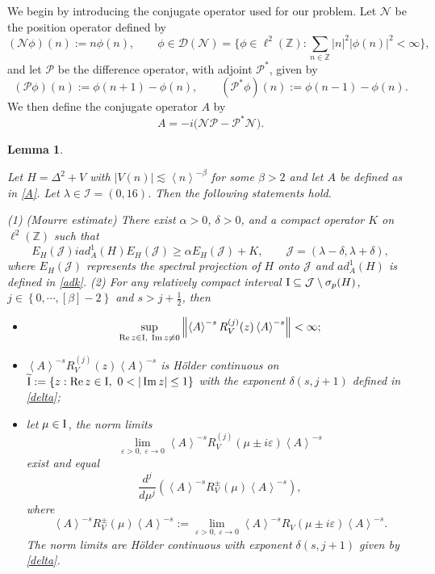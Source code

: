 \documentclass[reqno, 11pt]{amsart}
\newtheorem{lemma}[definition]{Lemma}
\newcommand\Z{\mathbb{Z}}
\newcommand\mcaI{\mathcal{I}}
\newcommand\mcaJ{\mathcal{J}}
\newcommand\mcaD{\mathcal{D}}
\newcommand\mcaN{\mathcal{N}}
\newcommand\mcaP{\mathcal{P}}
\numberwithin{equation}{section}
\begin{document}
We begin by introducing the conjugate operator used for our problem. Let $\mcaN$ be the position operator defined by
$$(\mcaN\phi)(n):=n\phi(n),\qquad \phi\in\mcaD(\mcaN)=\big\{\phi\in\ell^2(\Z):\sum\limits_{n\in\Z}|n|^2|\phi(n)|^2<\infty\big\},$$
and let $\mcaP$ be the difference operator, with adjoint $\mcaP^*$, given by
$$(\mcaP\phi)(n):=\phi(n+1)-\phi(n),\qquad (\mcaP^{*}\phi)(n):=\phi(n-1)-\phi(n).$$
We then define the conjugate operator $A$ by
\begin{equation}\label{A}
A=-i\big(\mcaN\mcaP-\mcaP^{*}\mcaN\big).
\end{equation}
\begin{lemma}\label{LAP lemma}
{Let $H=\Delta^2+V$ with $|V(n)|\lesssim \left<n\right>^{-\beta}$ for some $\beta>2$ and let $A$ be defined as in \eqref{A}. Let  $\lambda\in\mcaI=(0,16)$. Then the following statements hold.

{\rm (1) (}Mourre estimate{\rm)} There exist $\alpha>0$, $\delta>0$, and a compact operator $K$ on $\ell^2(\Z)$ such that
\begin{equation}\label{mourre estim}
E_{H}(\mcaJ)iad^{1}_{A}(H)E_{H}(\mcaJ)\geq\alpha E_{H}(\mcaJ)+K,\qquad \mcaJ=(\lambda-\delta,\lambda+\delta),
\end{equation}
where $E_{H}(\mcaJ)$ represents the spectral projection of $H$ onto  $\mcaJ$ and $ad^{1}_{A}(H)$ is defined in \eqref{adk}.
\vskip0.1cm
{\rm(2)} For any relatively compact interval ${\rm I}\subseteq\mcaJ\setminus\sigma_{p}(H)$, $j\in\left\{0,\cdots,[\beta]-2\right\}$ and $s>j+\frac{1}{2}$, then
\begin{itemize}
\item [{\rm (i)}]\begin{equation}\label{jth esti of Lem}
\sup\limits_{\operatorname{Re}z\in {\rm I},\ \operatorname{Im}z\neq0}\left\|\left<A\right>^{-s}R^{(j)}_V(z)\left<A\right>^{-s}\right\|<\infty;
\end{equation}
\item[{\rm (ii)}]  $\left<A\right>^{-s}R^{(j)}_V(z)\left<A\right>^{-s}$ is H\"{o}lder continuous on $\widetilde{\rm I}:=\{z:\operatorname{Re} z\in {\rm I},\ 0<|\operatorname{Im} z|\leq1\}$ with the exponent $\delta(s,j+1)$ defined in \eqref{delta};
    \vskip0.1cm
\item [{\rm (iii)}] let $\mu\in {\rm I}$, the norm limits
$$\lim\limits_{\varepsilon>0,\ \varepsilon\rightarrow0}\left<A\right>^{-s}R^{(j)}_V(\mu\pm i\varepsilon)\left<A\right>^{-s}$$
exist and equal
$$\frac{d^{j}}{d\mu^j}(\left<A\right>^{-s}R^{\pm}_V(\mu)\left<A\right>^{-s}),$$
where
$$\left<A\right>^{-s}R^{\pm}_V(\mu)\left<A\right>^{-s}:=\lim\limits_{\varepsilon>0,\ \varepsilon\rightarrow0}\left<A\right>^{-s}R_V(\mu\pm i\varepsilon)\left<A\right>^{-s}.$$
The norm limits are H\"{o}lder continuous with exponent $\delta(s,j+1)$ given by \eqref{delta}.
\end{itemize}
}
\end{lemma}
\end{document}
